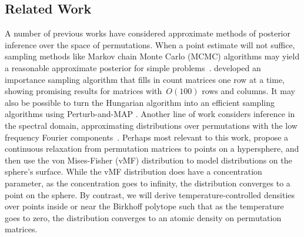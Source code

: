 \documentclass[twoside]{article}
\begin{document}
\subsection{Related Work}
A number of previous works have considered approximate methods of
posterior inference over the space of permutations.
When a point estimate will not suffice, sampling methods like Markov
chain Monte Carlo (MCMC) algorithms may yield a reasonable approximate
posterior for simple problems~\citep{diaconis1988group}.
\citet{harrison2013importance} developed an importance sampling
algorithm that fills in count matrices one row at a time, showing
promising results for matrices with~$O(100)$ rows and columns.  It may
also be possible to turn the Hungarian algorithm into an efficient
sampling algorithms using Perturb-and-MAP \citep{li2013efficient}.
Another line of work considers inference in the spectral domain,
approximating distributions over permutations with the low frequency
Fourier components~\citep{kondor2007multi, huang2009fourier}.  Perhaps
most relevant to this work, \citet{plis2011directional} propose a
continuous relaxation from permutation matrices to points on a
hypersphere, and then use the von Mises-Fisher (vMF) distribution to
model distributions on the sphere's surface. While the vMF
distribution does have a concentration parameter, as the concentration
goes to infinity, the distribution converges to a point on the sphere.
By contrast, we will derive temperature-controlled densities over
points inside or near the Birkhoff polytope such that as the
temperature goes to zero, the distribution converges to an atomic
density on permutation matrices.
\end{document}
